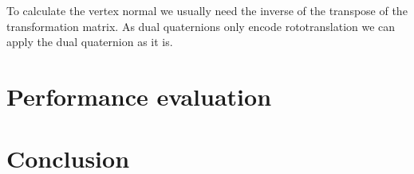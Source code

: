 \documentclass[12pt, a4paper]{article}
\begin{document}
To calculate the vertex normal we usually need the inverse of the transpose of the transformation matrix. As dual quaternions only encode rototranslation
we can apply the dual quaternion as it is.

\section{Performance evaluation}

\section{Conclusion}
\end{document}
